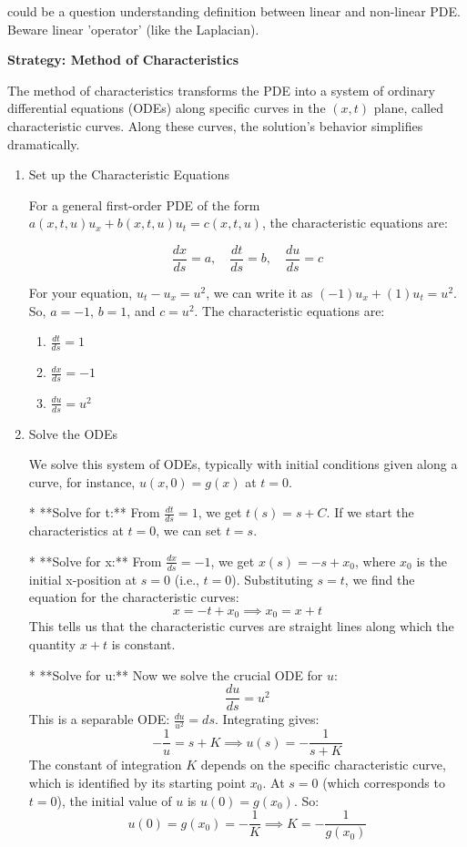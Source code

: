 \documentclass[12pt,a4paper]{report}
\begin{document}
{\begin{description}
\begin{itemize}
\begin{itemize}
		could be a question understanding definition between linear and non-linear PDE.  Beware linear 'operator' (like the Laplacian).
		

\textbf{Strategy: Method of Characteristics}

The method of characteristics transforms the PDE into a system of ordinary differential equations (ODEs) along specific curves in the \((x,t)\) plane, called characteristic curves. Along these curves, the solution's behavior simplifies dramatically.
\begin{enumerate}

\item  Set up the Characteristic Equations

For a general first-order PDE of the form \(a(x,t,u)u_x + b(x,t,u)u_t = c(x,t,u)\), the characteristic equations are:

\[ \frac{dx}{ds} = a, \quad \frac{dt}{ds} = b, \quad \frac{du}{ds} = c \]

For your equation, \(u_t - u_x = u^2\), we can write it as \((-1)u_x + (1)u_t = u^2\). So, \(a=-1\), \(b=1\), and \(c=u^2\). The characteristic equations are:

\begin{enumerate}
\item  \(\frac{dt}{ds} = 1\)
\item  \(\frac{dx}{ds} = -1\)
\item \(\frac{du}{ds} = u^2\)

\end{enumerate}

\item  Solve the ODEs

We solve this system of ODEs, typically with initial conditions given along a curve, for instance, \(u(x,0) = g(x)\) at \(t=0\).

*   **Solve for t:** From \(\frac{dt}{ds} = 1\), we get \(t(s) = s + C\). If we start the characteristics at \(t=0\), we can set \(t=s\).

*   **Solve for x:** From \(\frac{dx}{ds} = -1\), we get \(x(s) = -s + x_0\), where \(x_0\) is the initial x-position at \(s=0\) (i.e., \(t=0\)). Substituting \(s=t\), we find the equation for the characteristic curves:
    \[ x = -t + x_0 \implies x_0 = x+t \]
    This tells us that the characteristic curves are straight lines along which the quantity \(x+t\) is constant.

*   **Solve for u:** Now we solve the crucial ODE for \(u\):
    \[ \frac{du}{ds} = u^2 \]
    This is a separable ODE: \(\frac{du}{u^2} = ds\). Integrating gives:
    \[ -\frac{1}{u} = s + K \implies u(s) = -\frac{1}{s+K} \]
    The constant of integration \(K\) depends on the specific characteristic curve, which is identified by its starting point \(x_0\). At \(s=0\) (which corresponds to \(t=0\)), the initial value of \(u\) is \(u(0) = g(x_0)\). So:
    \[ u(0) = g(x_0) = -\frac{1}{K} \implies K = -\frac{1}{g(x_0)} \]


\end{enumerate}
\end{itemize}
\end{itemize}
\end{description}}
\end{document}
